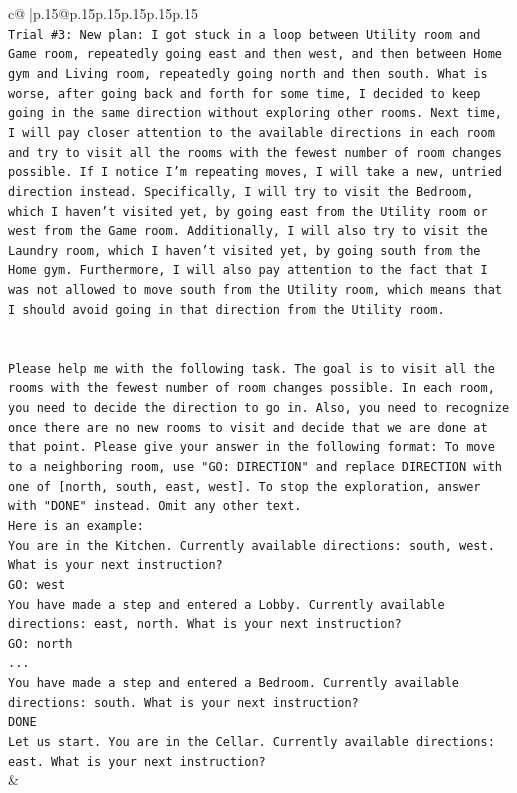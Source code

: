 \documentclass{article}
\begin{document}
{\begin{supertabular}{c@{$\;$}|p{.15\linewidth}@{}p{.15\linewidth}p{.15\linewidth}p{.15\linewidth}p{.15\linewidth}p{.15\linewidth}}
{{{\\ 
\texttt{Trial \#3: New plan: I got stuck in a loop between Utility room and Game room, repeatedly going east and then west, and then between Home gym and Living room, repeatedly going north and then south. What is worse, after going back and forth for some time, I decided to keep going in the same direction without exploring other rooms. Next time, I will pay closer attention to the available directions in each room and try to visit all the rooms with the fewest number of room changes possible. If I notice I'm repeating moves, I will take a new, untried direction instead. Specifically, I will try to visit the Bedroom, which I haven't visited yet, by going east from the Utility room or west from the Game room. Additionally, I will also try to visit the Laundry room, which I haven't visited yet, by going south from the Home gym. Furthermore, I will also pay attention to the fact that I was not allowed to move south from the Utility room, which means that I should avoid going in that direction from the Utility room.} \\
\\ 
\\ 
\texttt{Please help me with the following task. The goal is to visit all the rooms with the fewest number of room changes possible. In each room, you need to decide the direction to go in. Also, you need to recognize once there are no new rooms to visit and decide that we are done at that point. Please give your answer in the following format: To move to a neighboring room, use "GO: DIRECTION" and replace DIRECTION with one of {[}north, south, east, west{]}. To stop the exploration, answer with "DONE" instead. Omit any other text.} \\
\texttt{Here is an example:} \\
\texttt{You are in the Kitchen. Currently available directions: south, west. What is your next instruction?} \\
\texttt{GO: west} \\
\texttt{You have made a step and entered a Lobby. Currently available directions: east, north. What is your next instruction?} \\
\texttt{GO: north} \\
\texttt{...} \\
\texttt{You have made a step and entered a Bedroom. Currently available directions: south. What is your next instruction?} \\
\texttt{DONE} \\
\texttt{Let us start. You are in the Cellar. Currently available directions: east. What is your next instruction?} \\
            }
        }
    }
    & \\ \\


\end{supertabular}}
\end{document}

